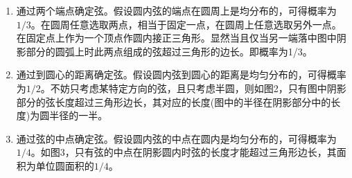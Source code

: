 \begin{enumerate}
\item 通过两个端点确定弦。假设圆内弦的端点在圆周上是均分布的，可得概率为$1/3$。在圆周任意选取两点，相当于固定一点，在圆周上任意选取另外一点。在固定点上作为一个顶点作圆内接正三角形。显然当且仅当另一端落中图中阴影部分的圆弧上时此两点组成的弦超过三角形的边长。即概率为1/3。
\item 通过到圆心的距离确定弦。假设圆内弦到圆心的距离是均匀分布的，可得概率为$1/2$。不妨只考虑某特定方向的弦，且只考虑半圆，则如图2，只有图中阴影部分的弦长度超过三角形边长，其对应的长度(图中的半径在阴影部分中的长度)为圆半径的一半。
\item 通过弦的中点确定弦。假设圆内弦的中点在圆内是均匀分布的，可得概率为$1/4$。如图3，只有弦的中点在阴影圆内时弦的长度才能超过三角形边长，其面积为单位圆面积的$1/4$。
\end{enumerate}

